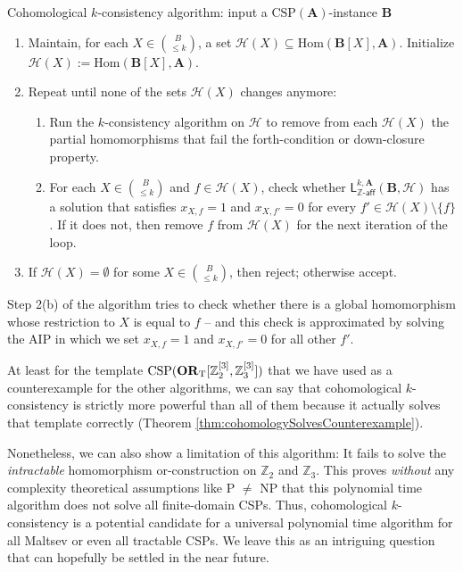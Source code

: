 \documentclass[a4paper,english, thm-restate]{lipics-v2021}
\newcommand{\ZZ}{\mathbb{Z}}
\newcommand{\StructA}{\mathbf{A}}
\newcommand{\StructB}{\mathbf{B}}
\newcommand{\CSP}[1]{\mathrm{CSP}(#1)}
\newcommand{\Hom}[2]{\mathrm{Hom}(#1,#2)}
\newcommand{\leqs}{\mathsf{L}}
\newcommand{\zafkleq}[4]{\leqs^{#1,#2}_{\ZZ\mathsf{\text{-}aff}}(#3,#4)}
\newcommand{\bbZ}{\mathbb{Z}}
\newcommand{\Hh}{\mathcal{H}}
\begin{document}
	\begin{algobox}{Cohomological $k$-consistency algorithm:
			input a $\CSP{\StructA}$-instance $\StructB$}
		\begin{enumerate}
			\item Maintain, for each $X \in \binom{B}{ \leq k}$, a set $\Hh(X) \subseteq \Hom{\StructB[X]}{\StructA}$. Initialize $\Hh(X) := \Hom{\StructB[X]}{\StructA}$.
			\item Repeat until none of the sets $\Hh(X)$ changes anymore: 
			\begin{enumerate}
				\item Run the $k$-consistency algorithm on $\Hh$ to remove from each $\Hh(X)$ the partial homomorphisms that fail the forth-condition or down-closure property.
				\item For each $X \in \binom{B}{ \leq k}$ and $f \in \Hh(X)$, check whether $\zafkleq{k}{\StructA}{\StructB}{\Hh}$ has a solution that satisfies $x_{X,f} = 1$ and $x_{X,f'} = 0$ for every $f' \in \Hh(X) \setminus \{f\}$. If it does not, then remove $f$ from $\Hh(X)$ for the next iteration of the loop. 
			\end{enumerate}	
			\item If $\Hh(X) = \emptyset$ for some $X \in \binom{B}{\leq k}$, then reject; otherwise accept. 
		\end{enumerate}
	\end{algobox}
	Step 2(b) of the algorithm tries to check whether
	there is a global homomorphism whose restriction to $X$ is equal to $f$
	-- and this check is approximated by solving the AIP
	in which we set $x_{X,f} = 1$ and $x_{X,f'} = 0$ for all other $f'$.
	
	At least for the template $\CSP{\ZtwoOrThreeInst}$ that we have used as a counterexample for the other algorithms, we can say that cohomological $k$-consistency is strictly more powerful than all of them because it actually solves that template correctly (Theorem \ref{thm:cohomologySolvesCounterexample}). 
	
	Nonetheless, we can also show a limitation of this algorithm: It fails to solve the \emph{intractable} homomorphism or-construction on $\bbZ_2$ and $\bbZ_3$. This proves \emph{without} any complexity theoretical assumptions like P $\neq$ NP that this polynomial time algorithm does not solve all finite-domain CSPs.
	Thus, cohomological $k$-consistency is a potential candidate for a universal polynomial time algorithm for all Maltsev or even all tractable CSPs. We leave this as an intriguing question that can hopefully be settled in the near future.
	
\end{document}
